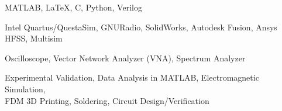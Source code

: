 \documentclass[10pt,letterpaper]{article}
\newenvironment{indentsection}[1]%
{\begin{list}{}%
	{\setlength{\leftmargin}{#1}}%
	\item[]%
}
{\end{list}}
\begin{document}
\begin{indentsection}{\parindent}
\begin{description*}
	\setlength{\itemsep}{0.25em}
	\item[Programming \& Analysis:]
	MATLAB, \LaTeX, C, Python, Verilog
	\item[Tools \& Simulation:]
	Intel Quartus/QuestaSim, GNURadio, SolidWorks, Autodesk Fusion, Ansys HFSS, Multisim
	\item[Test \& Measurement:]
	Oscilloscope, Vector Network Analyzer (VNA), Spectrum Analyzer
	\item[Research \& Prototyping:]
	Experimental Validation, Data Analysis in MATLAB, Electromagnetic Simulation, \\ FDM 3D Printing, Soldering, Circuit Design/Verification
	
\end{description*}
\end{indentsection}


\end{document}
